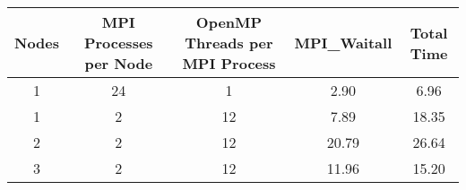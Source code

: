 \begin{tabular}{ccccc}
    \toprule
    \textbf{Nodes} & \textbf{MPI Processes per Node} & \textbf{OpenMP Threads per MPI Process} & \textbf{MPI\_Waitall} & \textbf{Total Time} \\
    \midrule
    1 & 24 & 1 & 2.90 & 6.96 \\
    1 & 2 & 12 & 7.89 & 18.35 \\
    2 & 2 & 12 & 20.79 & 26.64 \\
    3 & 2 & 12 & 11.96 & 15.20 \\
    \bottomrule
\end{tabular}

